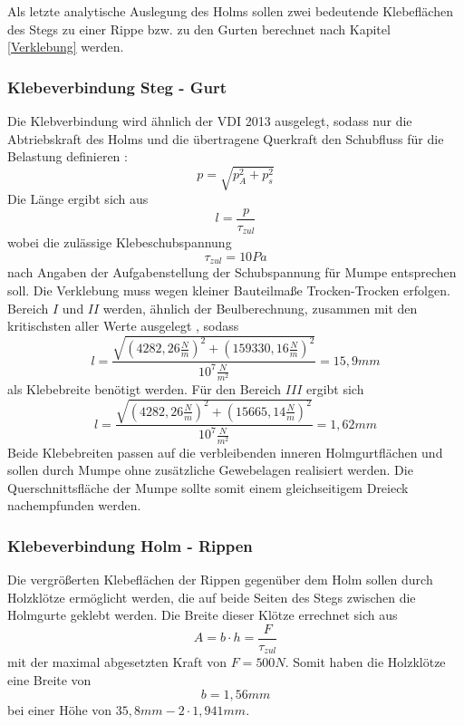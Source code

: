 

\noindent Als letzte analytische Auslegung des Holms sollen zwei bedeutende Klebeflächen des Stegs zu einer Rippe bzw. zu den Gurten berechnet nach Kapitel \ref{Verklebung} werden.
\subsubsection{Klebeverbindung Steg - Gurt}
Die Klebverbindung wird ähnlich der VDI 2013 ausgelegt, sodass nur die Abtriebskraft des Holms und die übertragene Querkraft den Schubfluss für die Belastung definieren \cite{item23}\cite{item5}:
\begin{equation}
	p=\sqrt{p_{A}^{2}+p_{s}^{2}}
\end{equation}
Die Länge ergibt sich aus 
\begin{equation}
	l=\frac{p}{\tau_{zul}}
\end{equation}
wobei die zulässige Klebeschubspannung
\begin{equation}
	\tau_{zul}=10 Pa
\end{equation}
nach Angaben der Aufgabenstellung der Schubspannung für Mumpe entsprechen soll. Die Verklebung muss wegen kleiner Bauteilmaße \glqq Trocken-Trocken\grqq\: erfolgen.\\

\noindent Bereich $I$ und $II$ werden, ähnlich der Beulberechnung, zusammen mit den kritischsten aller Werte ausgelegt , sodass 
\begin{equation}
	l=\frac{\sqrt{(4282,26\frac{N}{m})^{2}+(159330,16\frac{N}{m})^{2}}}{10^{7}\frac{N}{m^{2}}}=15,9mm
\end{equation}
als Klebebreite benötigt werden. Für den Bereich $III$ ergibt sich
\begin{equation}
	l=\frac{\sqrt{(4282,26\frac{N}{m})^{2}+(15665,14\frac{N}{m})^{2}}}{10^{7}\frac{N}{m^{2}}}=1,62mm
\end{equation}
Beide Klebebreiten passen auf die verbleibenden inneren Holmgurtflächen und sollen durch Mumpe ohne zusätzliche Gewebelagen realisiert werden. Die Querschnittsfläche der Mumpe sollte somit einem gleichseitigem Dreieck nachempfunden werden.

\subsubsection{Klebeverbindung Holm - Rippen}
Die vergrößerten Klebeflächen der Rippen gegenüber dem Holm sollen durch Holzklötze ermöglicht werden, die auf beide Seiten des Stegs zwischen die Holmgurte geklebt werden. Die Breite dieser Klötze errechnet sich aus 
\begin{equation}
	A=b\cdot h=\frac{F}{\tau_{zul}}
\end{equation}
mit der maximal abgesetzten Kraft von $F=500N$.
Somit haben die Holzklötze eine Breite von 
\begin{equation}
	b=1,56mm
\end{equation}
bei einer Höhe von $35,8mm-2\cdot 1,941mm$.